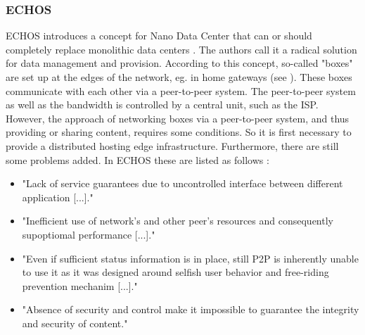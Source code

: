 \subsubsection{ECHOS}
ECHOS introduces a concept for Nano Data Center that can or should completely replace monolithic data centers \cite{Laoutaris:2008:EEC:1341431.1341442}. The authors call it a radical solution for data management and provision.
According to this concept, so-called "boxes" are set up at the edges of the network, eg. in home gateways (see \cite{technicolor}). These boxes communicate with each other via a peer-to-peer system. The peer-to-peer system as well as the bandwidth is controlled by a central unit, such as the ISP. However, the approach of networking boxes via a peer-to-peer system, and thus providing or sharing content, requires some conditions. So it is first necessary to provide a distributed hosting edge infrastructure. Furthermore, there are still some problems added. In ECHOS these are listed as follows \cite{Laoutaris:2008:EEC:1341431.1341442}:
\begin{itemize}
	\item "Lack of service guarantees due to uncontrolled interface between different application [...]."
	\item "Inefficient use of network's and other peer's resources and consequently supoptiomal performance [...]."
	\item "Even if sufficient status information is in place, still P2P is inherently unable to use it as it was designed around selfish user behavior and free-riding prevention mechanim [...]."
	\item "Absence of security and control make it impossible to guarantee the integrity and security of content."
\end{itemize}